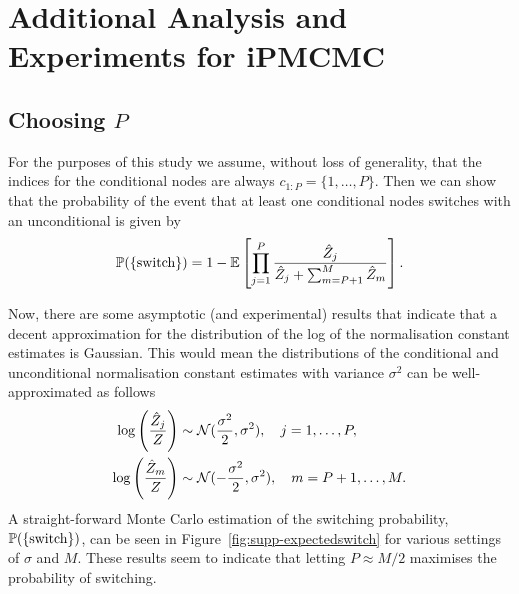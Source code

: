 
\chapter{Additional Analysis and Experiments for iPMCMC}
\label{sec:app:ipmcmc}

\section{Choosing $P$}
\label{sec:supp-choosep}
For the purposes of this study we assume, without loss of generality, that the indices for the conditional nodes are always $c_{1:P} = \{1,\ldots,P\}$. Then we can show that the probability of the event that at least one conditional nodes switches with an unconditional is given by
\begin{align}
\label{eq:switchingprob-supp}
\mathbb{P}(\{\text{switch}\}) = 1 - \mathbb{E}\left[\prod_{j=1}^P \frac{\hat Z_{j}}{\hat Z_{j} +\sum_{m=P+1}^M \hat Z_{m}}\right].
\end{align}

Now, there are some asymptotic (and experimental) results \citep{pitt2012some,berard2014lognormal,doucet2015efficient} that indicate that a decent approximation for the distribution of the log of the normalisation constant estimates is Gaussian. This would mean the distributions of the conditional and unconditional normalisation constant estimates with variance $\sigma^2$ can be well-approximated as follows
\begin{align}
\log \left(\frac{\hat Z_{j}}{Z}\right) &\sim \mathcal{N}(\frac{\sigma^2}{2},\sigma^2),\quad j = 1,\ldots,P,\\
\log \left(\frac{\hat Z_{m}}{Z}\right) &\sim \mathcal{N}(-\frac{\sigma^2}{2},\sigma^2),\quad m = P+1,\ldots,M.
\end{align}
A straight-forward Monte Carlo estimation of the switching probability, \ie $\mathbb{P}(\{\text{switch}\})$, can be seen in Figure~\ref{fig:supp-expectedswitch} for various settings of $\sigma$ and $M$. These results seem to indicate that letting $P \approx M/2$ maximises the probability of switching.

